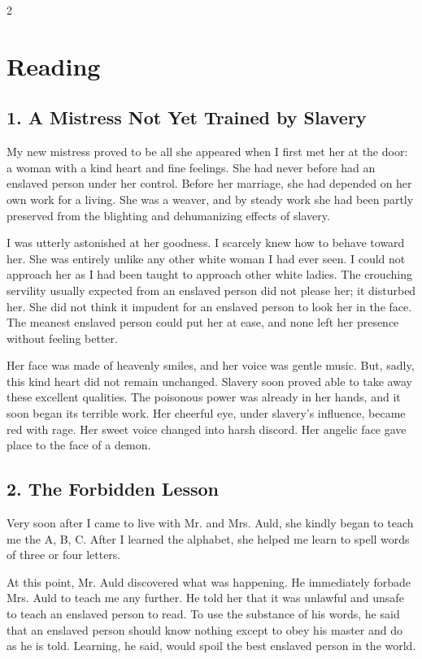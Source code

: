 \documentclass[12pt]{article}
\begin{document}
\begin{multicols}{2}
\section*{Reading}

\subsection*{1. A Mistress Not Yet Trained by Slavery}
My new mistress proved to be all she appeared when I first met her at the door: a woman with a kind heart and fine feelings. She had never before had an enslaved person under her control. Before her marriage, she had depended on her own work for a living. She was a weaver, and by steady work she had been partly preserved from the blighting and dehumanizing effects of slavery.

I was utterly astonished at her goodness. I scarcely knew how to behave toward her. She was entirely unlike any other white woman I had ever seen. I could not approach her as I had been taught to approach other white ladies. The crouching servility usually expected from an enslaved person did not please her; it disturbed her. She did not think it impudent for an enslaved person to look her in the face. The meanest enslaved person could put her at ease, and none left her presence without feeling better.

Her face was made of heavenly smiles, and her voice was gentle music. But, sadly, this kind heart did not remain unchanged. Slavery soon proved able to take away these excellent qualities. The poisonous power was already in her hands, and it soon began its terrible work. Her cheerful eye, under slavery's influence, became red with rage. Her sweet voice changed into harsh discord. Her angelic face gave place to the face of a demon.

\subsection*{2. The Forbidden Lesson}
Very soon after I came to live with Mr. and Mrs. Auld, she kindly began to teach me the A, B, C. After I learned the alphabet, she helped me learn to spell words of three or four letters.

At this point, Mr. Auld discovered what was happening. He immediately forbade Mrs. Auld to teach me any further. He told her that it was unlawful and unsafe to teach an enslaved person to read. To use the substance of his words, he said that an enslaved person should know nothing except to obey his master and do as he is told. Learning, he said, would spoil the best enslaved person in the world.


\end{multicols}
\end{document}
